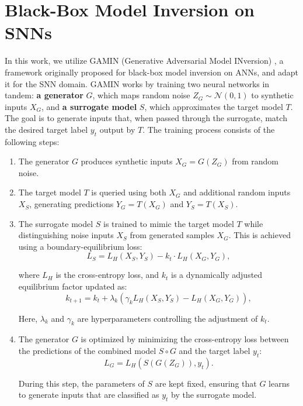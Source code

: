 \section{Black-Box Model Inversion on SNNs}
\label{sec: methodology}





\noindent
In this work, we utilize GAMIN (Generative Adversarial Model INversion) \cite{aivodji2019gamin}, a framework originally proposed for black-box model inversion on ANNs, and adapt it for the SNN domain. GAMIN works by training two neural networks in tandem: \textbf{a generator} $G$, which maps random noise \mbox{$Z_G \sim \mathcal{N}(0, 1)$} to synthetic inputs $X_G$, and \textbf{a surrogate model} $S$, which approximates the target model $T$. The goal is to generate inputs that, when passed through the surrogate, match the desired target label $y_t$ output by $T$. The training process consists of the following steps:



\begin{enumerate}
    \item The generator $G$ produces synthetic inputs $X_G = G(Z_G)$ from random noise.
    \item The target model $T$ is queried using both $X_G$ and additional random inputs $X_S$, generating predictions $Y_G = T(X_G)$ and $Y_S = T(X_S)$.
    \item The surrogate model $S$ is trained to mimic the target model $T$ while distinguishing noise inputs $X_S$ from generated samples $X_G$. This is achieved using a boundary-equilibrium loss:
    \begin{equation}
        L_S = L_H(X_S, Y_S) - k_t \cdot L_H(X_G, Y_G),
    \end{equation}
    
    where $L_H$ is the cross-entropy loss, and $k_t$ is a dynamically adjusted equilibrium factor updated as:
    \begin{equation}
        k_{t+1} = k_t + \lambda_k (\gamma_k L_H(X_S, Y_S) - L_H(X_G, Y_G)),
    \end{equation}
    
    Here, $\lambda_k$ and $\gamma_k$ are hyperparameters controlling the adjustment of $k_t$.

    \item The generator $G$ is optimized by minimizing the cross-entropy loss between the predictions of the combined model $S \circ G$ and the target label $y_t$:
    \begin{equation}
            L_G = L_H(S(G(Z_G)), y_t).
    \end{equation}

    During this step, the parameters of $S$ are kept fixed, ensuring that $G$ learns to generate inputs that are classified as $y_t$ by the surrogate model.

\end{enumerate}



